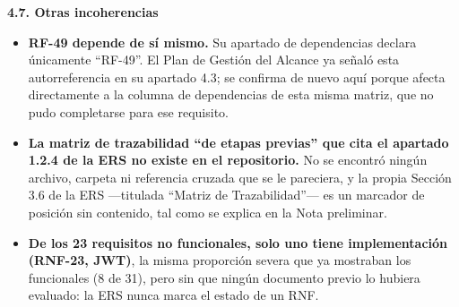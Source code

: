 \documentclass[12pt,varwidth=170mm,border=10pt]{standalone}
\newcommand{\subsectiontitle}[1]{%
  \par\vspace{1.3ex}%
  {\normalfont\large\bfseries #1\par}%
  \vspace{0.5ex}%
}
\begin{document}
\subsectiontitle{4.7. Otras incoherencias}

\begin{itemize}
  \item \textbf{RF-49 depende de sí mismo.} Su apartado de dependencias declara únicamente ``RF-49''. El Plan de Gestión del Alcance ya señaló esta autorreferencia en su apartado 4.3; se confirma de nuevo aquí porque afecta directamente a la columna de dependencias de esta misma matriz, que no pudo completarse para ese requisito.
  \item \textbf{La matriz de trazabilidad ``de etapas previas'' que cita el apartado 1.2.4 de la ERS no existe en el repositorio.} No se encontró ningún archivo, carpeta ni referencia cruzada que se le pareciera, y la propia Sección 3.6 de la ERS —titulada ``Matriz de Trazabilidad''— es un marcador de posición sin contenido, tal como se explica en la Nota preliminar.
  \item \textbf{De los 23 requisitos no funcionales, solo uno tiene implementación (RNF-23, JWT)}, la misma proporción severa que ya mostraban los funcionales (8 de 31), pero sin que ningún documento previo lo hubiera evaluado: la ERS nunca marca el estado de un RNF.
\end{itemize}
\end{document}
